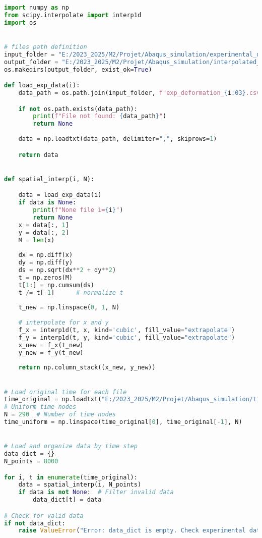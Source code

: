 \documentclass[12pt,a4paper]{article}
\begin{document}
\begin{lstlisting}[language=Python, caption={Interpolation spatiale et temporelle}]
import numpy as np
from scipy.interpolate import interp1d
import os


# files path definition
input_folder = "E:/2023_2025/M2/Projet/Abaqus_simulation/experimental_data"
output_folder = "E:/2023_2025/M2/Projet/Abaqus_simulation/interpolated_exp_data"
os.makedirs(output_folder, exist_ok=True)

def load_exp_data(i):
    data_path = os.path.join(input_folder, f"exp_deformation_{i:03}.csv")

    if not os.path.exists(data_path):
        print(f"File not found: {data_path}")
        return None
    
    data = np.loadtxt(data_path, delimiter=",", skiprows=1)

    return data


def spatial_interp(i, N):

    data = load_exp_data(i)
    if data is None:
        print(f"None file i={i}")
        return None
    x = data[:, 1]
    y = data[:, 2]
    M = len(x)
    
    dx = np.diff(x)
    dy = np.diff(y)
    ds = np.sqrt(dx**2 + dy**2) 
    t = np.zeros(M)
    t[1:] = np.cumsum(ds)         
    t /= t[-1]      # normalize t             
    
    t_new = np.linspace(0, 1, N)
    
    # interpolate for x and y
    f_x = interp1d(t, x, kind='cubic', fill_value="extrapolate")
    f_y = interp1d(t, y, kind='cubic', fill_value="extrapolate")
    x_new = f_x(t_new)
    y_new = f_y(t_new)
    
    return np.column_stack((x_new, y_new))


# Load original time for each file
time_original = np.loadtxt("E:/2023_2025/M2/Projet/Abaqus_simulation/time_abaqus.csv", skiprows=1)
# Uniform time nodes
N = 290  # Number of time nodes
time_uniform = np.linspace(time_original[0], time_original[-1], N)


# Load and organize data by time step
data_dict = {}
N_points = 8000

for i, t in enumerate(time_original):
    data = spatial_interp(i, N_points)
    if data is not None:  # Filter invalid data
        data_dict[t] = data

# Check for valid data
if not data_dict:
    raise ValueError("Error: data_dict is empty. Check experimental data files")


\end{lstlisting}
\end{document}
